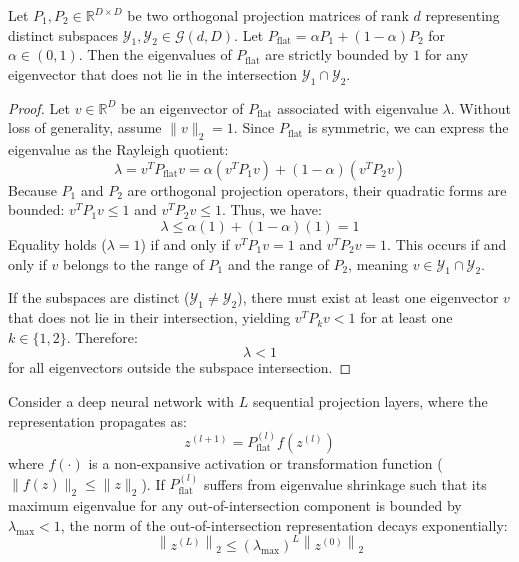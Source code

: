 \begin{proposition}
\label{prop:shrinkage}
Let $P_1, P_2 \in \mathbb{R}^{D \times D}$ be two orthogonal projection matrices of rank $d$ representing distinct subspaces $\mathcal{Y}_1, \mathcal{Y}_2 \in \mathcal{G}(d, D)$. Let $P_{\text{flat}} = \alpha P_1 + (1-\alpha) P_2$ for $\alpha \in (0, 1)$. Then the eigenvalues of $P_{\text{flat}}$ are strictly bounded by $1$ for any eigenvector that does not lie in the intersection $\mathcal{Y}_1 \cap \mathcal{Y}_2$.
\end{proposition}

\begin{proof}
Let $v \in \mathbb{R}^D$ be an eigenvector of $P_{\text{flat}}$ associated with eigenvalue $\lambda$. Without loss of generality, assume $\|v\|_2 = 1$. Since $P_{\text{flat}}$ is symmetric, we can express the eigenvalue as the Rayleigh quotient:
\begin{equation}
    \lambda = v^T P_{\text{flat}} v = \alpha (v^T P_1 v) + (1-\alpha) (v^T P_2 v)
\end{equation}
Because $P_1$ and $P_2$ are orthogonal projection operators, their quadratic forms are bounded: $v^T P_1 v \leq 1$ and $v^T P_2 v \leq 1$. Thus, we have:
\begin{equation}
    \lambda \leq \alpha (1) + (1-\alpha) (1) = 1
\end{equation}
Equality holds ($\lambda = 1$) if and only if $v^T P_1 v = 1$ and $v^T P_2 v = 1$. This occurs if and only if $v$ belongs to the range of $P_1$ and the range of $P_2$, meaning $v \in \mathcal{Y}_1 \cap \mathcal{Y}_2$. 

If the subspaces are distinct ($\mathcal{Y}_1 \neq \mathcal{Y}_2$), there must exist at least one eigenvector $v$ that does not lie in their intersection, yielding $v^T P_k v < 1$ for at least one $k \in \{1, 2\}$. Therefore:
\begin{equation}
    \lambda < 1
\end{equation}
for all eigenvectors outside the subspace intersection.
\end{proof}

\begin{proposition}
\label{prop:collapse}
Consider a deep neural network with $L$ sequential projection layers, where the representation propagates as:
\begin{equation}
    z^{(l+1)} = P_{\text{flat}}^{(l)} f\left(z^{(l)}\right)
\end{equation}
where $f(\cdot)$ is a non-expansive activation or transformation function ($\|f(z)\|_2 \leq \|z\|_2$). If $P_{\text{flat}}^{(l)}$ suffers from eigenvalue shrinkage such that its maximum eigenvalue for any out-of-intersection component is bounded by $\lambda_{\max} < 1$, the norm of the out-of-intersection representation decays exponentially:
\begin{equation}
    \left\|z^{(L)}\right\|_2 \leq (\lambda_{\max})^L \left\|z^{(0)}\right\|_2
\end{equation}
\end{proposition}

